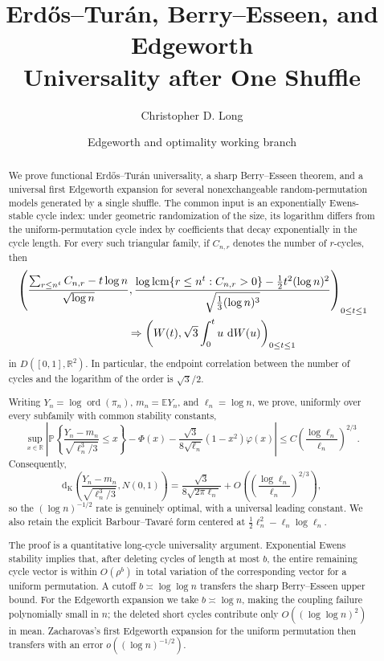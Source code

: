 \documentclass[11pt]{article}
\title{Erd\H{o}s--Tur\'an, Berry--Esseen, and Edgeworth\\
Universality after One Shuffle}
\author{Christopher D. Long}
\date{Edgeworth and optimality working branch}
\theoremstyle{definition}
\theoremstyle{remark}
\newcommand{\Pp}{\mathbb P}
\newcommand{\Ee}{\mathbb E}
\newcommand{\dd}{\,\mathrm d}
\newcommand{\ord}{\operatorname{ord}}
\newcommand{\lcm}{\operatorname{lcm}}
\newcommand{\Kol}{\mathrm d_{\mathrm K}}
\newcommand{\R}{\mathbb R}
\begin{document}
\maketitle

\begin{abstract}
We prove functional Erd\H{o}s--Tur\'an universality, a sharp
Berry--Esseen theorem, and a universal first Edgeworth expansion for
several nonexchangeable random-permutation models generated by a single
shuffle.  The common input is an exponentially Ewens-stable cycle index:
under geometric randomization of the size, its logarithm differs from the
uniform-permutation cycle index by coefficients that decay exponentially
in the cycle length.  For every such triangular family, if $C_{n,r}$
denotes the number of $r$-cycles, then
\[
 \begin{aligned}
 &\left(
 \frac{\sum_{r\le n^t}C_{n,r}-t\log n}{\sqrt{\log n}},
 \frac{\log\lcm\{r\le n^t:C_{n,r}>0\}
             -\frac12t^2(\log n)^2}
      {\sqrt{\frac13(\log n)^3}}
 \right)_{0\le t\le1}
 \\
 &\hspace{35mm}\Rightarrow
 \left(
 W(t),\sqrt3\int_0^t u\,\dd W(u)
 \right)_{0\le t\le1}
 \end{aligned}
\]
in $D([0,1],\R^2)$.  In particular, the endpoint correlation between the
number of cycles and the logarithm of the order is $\sqrt3/2$.

Writing $Y_n=\log\ord(\pi_n)$, $m_n=\Ee Y_n$, and $\ell_n=\log n$, we
prove, uniformly over every subfamily with common stability constants,
\[
 \sup_{x\in\R}\left|
 \Pp\left\{\frac{Y_n-m_n}{\sqrt{\ell_n^3/3}}\le x\right\}
 -\Phi(x)
 -\frac{\sqrt3}{8\sqrt{\ell_n}}(1-x^2)\varphi(x)
 \right|
 \le
 C\left(\frac{\log\ell_n}{\ell_n}\right)^{2/3}.
\]
Consequently,
\[
 \Kol\!\left(
 \frac{Y_n-m_n}{\sqrt{\ell_n^3/3}},N(0,1)
 \right)
 =
 \frac{\sqrt3}{8\sqrt{2\pi\ell_n}}
 +O\!\left(\left(\frac{\log\ell_n}{\ell_n}\right)^{2/3}\right),
\]
so the $(\log n)^{-1/2}$ rate is genuinely optimal, with a universal
leading constant.  We also retain the explicit Barbour--Tavar\'e form
centered at $\frac12\ell_n^2-\ell_n\log\ell_n$.

The proof is a quantitative long-cycle universality argument.  Exponential
Ewens stability implies that, after deleting cycles of length at most $b$,
the entire remaining cycle vector is within $O(\rho^b)$ in total variation
of the corresponding vector for a uniform permutation.  A cutoff
$b\asymp\log\log n$ transfers the sharp Berry--Esseen upper bound.  For the
Edgeworth expansion we take $b\asymp\log n$, making the coupling failure
polynomially small in $n$; the deleted short cycles contribute only
$O((\log\log n)^2)$ in mean.  Zacharovas's first Edgeworth expansion for
the uniform permutation then transfers with an error
$o((\log n)^{-1/2})$.


\end{abstract}
\end{document}

